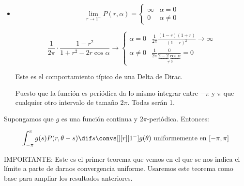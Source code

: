 \begin{itemize}
			\item \[
			\lim_{r \to 1^-} P(r, \alpha) = \begin{cases}
				\infty & \alpha = 0 \\
				0 & \alpha \neq 0
			\end{cases}
			\]

			\[
				\frac{1}{2\pi} \cdot \frac{1-r^2}{1+r^2-2r\cos \alpha} \rightarrow \begin{cases}
				\alpha = 0 & \frac{1}{2\pi} \frac{(1-r)(1+r)}{(1-r)^2} \rightarrow \infty \\
				\alpha \neq 0  & \frac{1}{2\pi} \frac{0}{\underbrace{2-2\cos \alpha}_{\neq 0}} = 0
				\end{cases}
			\]

			Este es el comportamiento típico de una Delta de Dirac.

			\begin{center}
			\end{center}

			Puesto que la función es periódica da lo mismo integrar entre $-\pi$ y $\pi$ que cualquier otro intervalo de tamaño $2\pi$. Todas serán 1.

		\end{itemize}

		\begin{theorem}
			Supongamos que $g$ es una función continua y $2\pi$-periódica. Entonces:

			\[ \int^\pi_{-\pi} g(s)P(r, \theta-s) \dif s \convs[][r][1^-] g(\theta) \text{ uniformemente en } [-\pi,\pi] \]

			IMPORTANTE: Este es el primer teorema que vemos en el que se nos indica el límite a parte de darnos convergencia uniforme. Usaremos este teorema como base para ampliar los resultados anteriores.
		\end{theorem}

